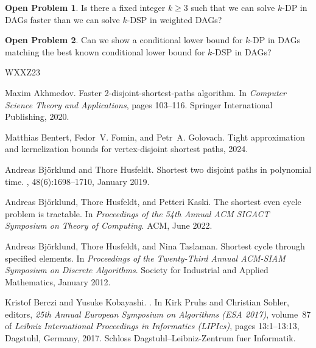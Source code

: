 \documentclass[11pt]{article}
\theoremstyle{definition}
\newtheorem{open}{Open Problem}
\begin{document}
\begin{open}
Is there a fixed integer $k\ge 3$  such that we can solve \textsf{$k$-DP} in DAGs faster than we can solve \textsf{$k$-DSP} in weighted DAGs? 
\end{open}

\begin{open}
    Can we show a conditional lower bound for \textsf{$k$-DP} in DAGs matching the best known conditional lower bound for \textsf{$k$-DSP} in DAGs? 
\end{open}

\newpage


\newcommand{\etalchar}[1]{$^{#1}$}
\begin{thebibliography}{WXXZ23}

Maxim Akhmedov.
\newblock Faster 2-disjoint-shortest-paths algorithm.
\newblock In {\em Computer Science {\textendash} Theory and Applications},
  pages 103--116. Springer International Publishing, 2020.

Matthias Bentert, Fedor~V. Fomin, and Petr~A. Golovach.
\newblock Tight approximation and kernelization bounds for vertex-disjoint
  shortest paths, 2024.

Andreas Bj\"{o}rklund and Thore Husfeldt.
\newblock Shortest two disjoint paths in polynomial time.
, 48(6):1698–1710, January 2019.

Andreas Bj\"{o}rklund, Thore Husfeldt, and Petteri Kaski.
\newblock The shortest even cycle problem is tractable.
\newblock In {\em Proceedings of the 54th Annual {ACM} {SIGACT} Symposium on
  Theory of Computing}. {ACM}, June 2022.

Andreas Bj\"{o}rklund, Thore Husfeldt, and Nina Taslaman.
\newblock Shortest cycle through specified elements.
\newblock In {\em Proceedings of the Twenty-Third Annual {ACM}-{SIAM} Symposium
  on Discrete Algorithms}. Society for Industrial and Applied Mathematics,
  January 2012.

Kristof Berczi and Yusuke Kobayashi.
.
\newblock In Kirk Pruhs and Christian Sohler, editors, {\em 25th Annual
  European Symposium on Algorithms (ESA 2017)}, volume~87 of {\em Leibniz
  International Proceedings in Informatics (LIPIcs)}, pages 13:1--13:13,
  Dagstuhl, Germany, 2017. Schloss Dagstuhl--Leibniz-Zentrum fuer Informatik.


\end{thebibliography}
\end{document}
